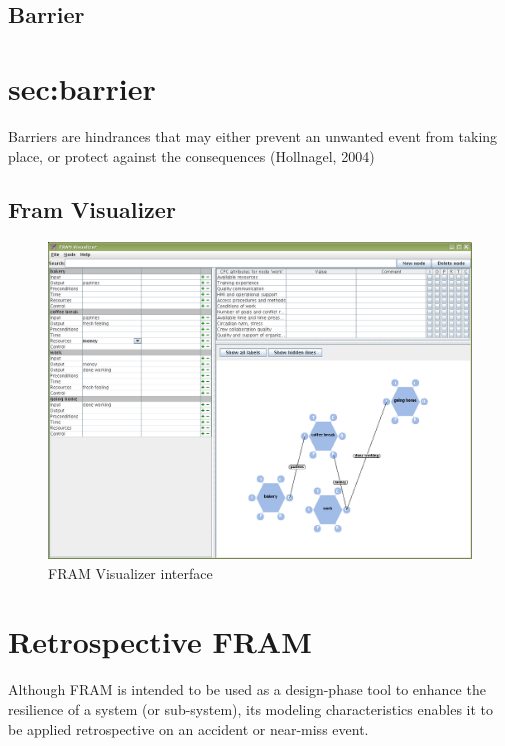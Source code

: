 \subsection{Barrier}
\section{sec:barrier}
Barriers are hindrances that may either prevent an unwanted event from taking place, or protect against the consequences (Hollnagel, 2004)

\subsection{Fram Visualizer}


\begin{figure}
 \centering
   \includegraphics[width=320pt]{figures/framvisualizer1.png}
 \caption{FRAM Visualizer interface}
 \label{fig:fram_visualizer_interface}
\end{figure}

\section{Retrospective FRAM}
Although FRAM is intended to be used as a design-phase tool to enhance the resilience of a system (or sub-system), its modeling characteristics enables it to be applied retrospective on an accident or near-miss event.



